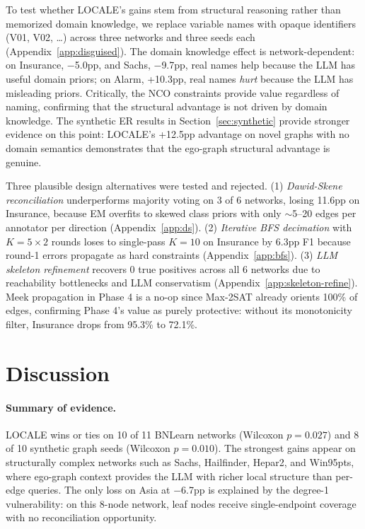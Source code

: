 \documentclass{article} %
\begin{document}
To test whether LOCALE's gains stem from structural reasoning rather than memorized domain knowledge, we replace variable names with opaque identifiers (V01, V02, \ldots) across three networks and three seeds each (Appendix~\ref{app:disguised}). The domain knowledge effect is network-dependent: on Insurance, $-$5.0pp, and Sachs, $-$9.7pp, real names help because the LLM has useful domain priors; on Alarm, +10.3pp, real names \textit{hurt} because the LLM has misleading priors. Critically, the NCO constraints provide value regardless of naming, confirming that the structural advantage is not driven by domain knowledge. The synthetic ER results in Section~\ref{sec:synthetic} provide stronger evidence on this point: LOCALE's +12.5pp advantage on novel graphs with no domain semantics demonstrates that the ego-graph structural advantage is genuine.

Three plausible design alternatives were tested and rejected. (1) \textit{Dawid-Skene reconciliation} underperforms majority voting on 3 of 6 networks, losing 11.6pp on Insurance, because EM overfits to skewed class priors with only $\sim$5--20 edges per annotator per direction (Appendix~\ref{app:ds}). (2) \textit{Iterative BFS decimation} with $K{=}5 \times 2$ rounds loses to single-pass $K{=}10$ on Insurance by 6.3pp F1 because round-1 errors propagate as hard constraints (Appendix~\ref{app:bfs}). (3) \textit{LLM skeleton refinement} recovers 0 true positives across all 6 networks due to reachability bottlenecks and LLM conservatism (Appendix~\ref{app:skeleton-refine}). Meek propagation in Phase 4 is a no-op since Max-2SAT already orients 100\% of edges, confirming Phase 4's value as purely protective: without its monotonicity filter, Insurance drops from 95.3\% to 72.1\%.

\section{Discussion}

\paragraph{Summary of evidence.}
LOCALE wins or ties on 10 of 11 BNLearn networks (Wilcoxon $p{=}0.027$) and 8 of 10 synthetic graph seeds (Wilcoxon $p{=}0.010$). The strongest gains appear on structurally complex networks such as Sachs, Hailfinder, Hepar2, and Win95pts, where ego-graph context provides the LLM with richer local structure than per-edge queries. The only loss on Asia at $-$6.7pp is explained by the degree-1 vulnerability: on this 8-node network, leaf nodes receive single-endpoint coverage with no reconciliation opportunity.
\end{document}
